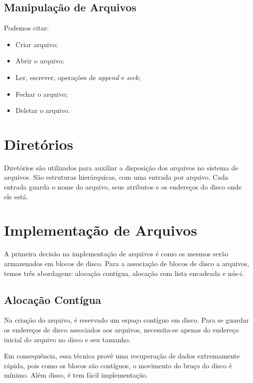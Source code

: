 \subsection{Manipulação de Arquivos}
Podemos citar:
\begin{itemize}
  \item Criar arquivo;
  \item Abrir o arquivo;
  \item Ler, escrever, operações de \textit{append} e \textit{seek};
  \item Fechar o arquivo;
  \item Deletar o arquivo.
\end{itemize}










\section{Diretórios}
Diretórios são utilizados para auxiliar a disposição dos arquivos no sistema de arquivos. São estruturas hierárquicas, com uma entrada por arquivo. Cada entrada guarda o nome do arquivo, seus atributos e os endereços do disco onde ele está.







\section{Implementação de Arquivos}
A primeira decisão na implementação de arquivos é como os mesmos serão armazenados em blocos de disco. Para a associação de blocos de disco a arquivos, temos três abordagens: alocação contígua, alocação com lista encadeada e nós-i.





\subsection{Alocação Contígua}
Na criação do arquivo, é reservado um espaço contíguo em disco. Para se guardar os endereços de disco associados aos arquivos, necessita-se apenas do endereço inicial do arquivo no disco e seu tamanho.

Em consequência, essa técnica provê uma recuperação de dados extremamente rápida, pois como os blocos são contíguos, o movimento do braço do disco é mínimo. Além disso, é tem fácil implementação.

